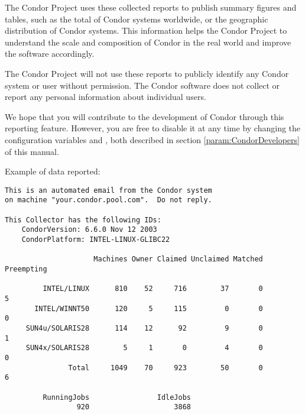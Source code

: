 The Condor Project uses these collected reports to publish
summary figures and tables, such as the total of Condor systems
worldwide, or the geographic distribution of Condor systems.
This information helps the Condor Project to understand
the scale and composition of Condor in the real world
and improve the software accordingly.

The Condor Project will not use these reports to publicly
identify any Condor system or user without permission.
The Condor software does not collect or report any personal
information about individual users.

We hope that you will contribute to the development of Condor
through this reporting feature.
However, you are free to disable it at any time by
changing the configuration variables 
and ,
both described in section \ref{param:CondorDevelopers} of this manual.

Example of data reported:

\begin{verbatim}
This is an automated email from the Condor system
on machine "your.condor.pool.com".  Do not reply.

This Collector has the following IDs:
    CondorVersion: 6.6.0 Nov 12 2003
    CondorPlatform: INTEL-LINUX-GLIBC22

                     Machines Owner Claimed Unclaimed Matched Preempting

         INTEL/LINUX      810    52     716        37       0          5
       INTEL/WINNT50      120     5     115         0       0          0
     SUN4u/SOLARIS28      114    12      92         9       0          1
     SUN4x/SOLARIS28        5     1       0         4       0          0
               Total     1049    70     923        50       0          6

         RunningJobs                IdleJobs
                 920                    3868
\end{verbatim}



